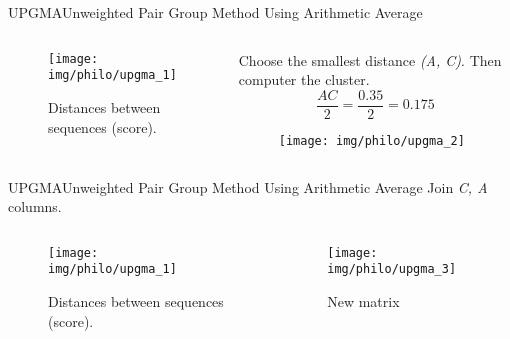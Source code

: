 \documentclass[10pt]{beamer}
\newcommand{\1}{
	\setbeamertemplate{background}{
		\texttt{[image: img/1]}
		\tikz[overlay] \fill[fill opacity=0.75,fill=white] (0,0) rectangle (-\paperwidth,\paperheight);
	}
}
\begin{document}
\begin{frame}{UPGMA}{Unweighted Pair Group Method Using Arithmetic Average}
	\begin{columns}
		\begin{column}{0.48\textwidth}
			\begin{figure}
				\texttt{[image: img/philo/upgma\_1]}
				\caption{Distances between sequences (score).}
			\end{figure}
		\end{column}
		\begin{column}{0.48\textwidth}
			
			Choose the smallest distance \textit{(A, C)}. Then computer the cluster.\\ 
			
			\begin{equation*}
				\frac{AC}{2} = \frac{0.35}{2} = 0.175
			\end{equation*}			
			
			\begin{figure}
				\texttt{[image: img/philo/upgma\_2]}
			\end{figure}
			
		\end{column}
	\end{columns}

\end{frame}

\begin{frame}{UPGMA}{Unweighted Pair Group Method Using Arithmetic Average}
	Join \textit{C, A} columns. 
	\begin{columns}
		\begin{column}{0.48\textwidth}
			\begin{figure}
				\texttt{[image: img/philo/upgma\_1]}
				\caption{Distances between sequences (score).}
			\end{figure}
		\end{column}
		\begin{column}{0.48\textwidth}	
			\begin{figure}
				\texttt{[image: img/philo/upgma\_3]}
				\caption{New matrix}
			\end{figure}			
		\end{column}
	\end{columns}
	
\end{frame}
\end{document}
